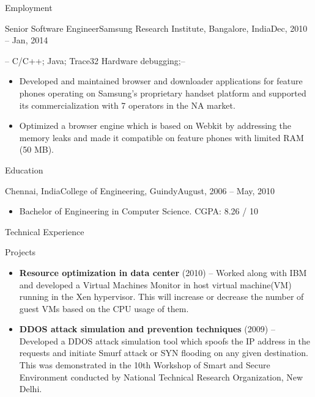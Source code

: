 \documentclass[]{mcdowellcv}
\begin{document}
\begin{cvsection}{Employment}
\begin{cvsubsection}{Senior Software Engineer}{Samsung Research Institute, Bangalore, India}{Dec, 2010 -- Jan, 2014}
			\item  {} -- C/C++; Java; Trace32 Hardware debugging;--
			\begin{itemize}
				\item Developed and maintained browser and downloader applications for feature phones operating on Samsung's proprietary handset platform and supported its commercialization with 7 operators in the NA market.
				\item Optimized a browser engine which is based on Webkit by addressing the memory leaks and made it compatible on feature phones with limited RAM (50 MB).
			\end{itemize}
		\end{cvsubsection}
	\end{cvsection}

	\begin{cvsection}{Education}
		\begin{cvsubsection}{Chennai, India}{College of Engineering, Guindy}{August, 2006 --  May, 2010}

			\begin{itemize}
			\end{itemize}
			\begin{itemize}
				\item Bachelor of Engineering in Computer Science. {      }{      }{      }{      } {      }{      }{      }{      } {      }{      }{      }{      } {      }{      }{      }{      } {      }{      }{      }{      } {      }{      }{      }{      } {      }{      }{      }{      } {      }{      }{      }{      }  {      }{      }{      }{      } {      }{      }{      }{      } {      }{      }{      }{      } {      }CGPA: 8.26 / 10
			\end{itemize}
		\end{cvsubsection}
	\end{cvsection}
		\begin{cvsection}{Technical Experience}
		\begin{cvsubsection}{Projects}{}{}
			\begin{itemize}
				\item \textbf{Resource optimization in data center} (2010) -- Worked along with IBM and developed a Virtual Machines Monitor in host virtual machine(VM) running in the Xen hypervisor. This will increase or decrease the number of guest VMs based on the CPU usage of them.
				\item \textbf{DDOS attack simulation and prevention techniques} (2009) -- Developed a DDOS attack simulation tool which spoofs the IP address in the requests and initiate Smurf attack or SYN flooding on any given destination. This was demonstrated in the 10th Workshop of
Smart and Secure Environment conducted by National Technical Research Organization, New Delhi.\end{itemize}
		\end{cvsubsection}
	\end{cvsection}
\end{document}
